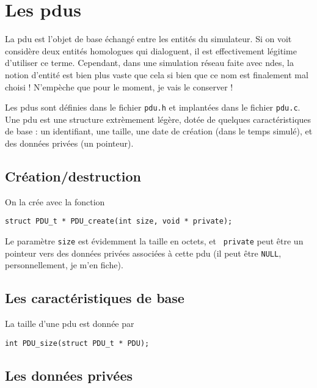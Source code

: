 %
\section{Les {\sc pdu}s}
\label{section:pdu}

   La {\sc pdu} est l'objet de base échangé entre les entités du
simulateur. Si on voit considère deux entités homologues qui
dialoguent, il est effectivement légitime d'utiliser ce
terme. Cependant, dans une simulation réseau faite avec {\sc ndes}, la
notion d'entité est bien plus vaste que cela si bien que ce nom est
finalement mal choisi ! N'empèche que pour le moment, je vais le
conserver !

   Les {\sc pdu}s sont définies dans le fichier {\tt pdu.h} et
implantées dans le fichier {\tt pdu.c}. Une {\sc pdu} est une
structure extrèmement légère, dotée de quelques caractéristiques de
base : un identifiant, une taille, une date de création (dans le temps
simulé), et des données privées (un pointeur).

%
\subsection{Création/destruction}

   On la crée avec la fonction

\begin{verbatim}
struct PDU_t * PDU_create(int size, void * private);
\end{verbatim}

   Le paramètre {\tt size} est évidemment la taille en octets, et {\tt
private} peut être un pointeur vers des données privées associées à
cette {\sc pdu} (il peut être {\tt NULL}, personnellement, je m'en
fiche).

%
\subsection{Les caractéristiques de base}

   La taille d'une {\sc pdu} est donnée par

\begin{verbatim}
int PDU_size(struct PDU_t * PDU);
\end{verbatim}

%
\subsection{Les données privées}

